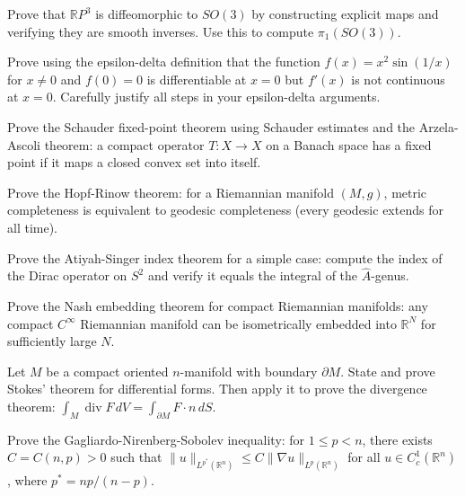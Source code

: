 \documentclass[12pt,a4paper]{exam}
\begin{document}
\begin{questions}
\vspace{0.3cm}

\question[3]
Prove that $\mathbb{R}P^3$ is diffeomorphic to $SO(3)$ by constructing explicit maps and verifying they are smooth inverses. Use this to compute $\pi_1(SO(3))$.

\vspace{0.3cm}

\question[3]
Prove using the epsilon-delta definition that the function $f(x) = x^2 \sin(1/x)$ for $x \neq 0$ and $f(0) = 0$ is differentiable at $x = 0$ but $f'(x)$ is not continuous at $x = 0$. Carefully justify all steps in your epsilon-delta arguments.

\vspace{0.3cm}

\question[2]
Prove the Schauder fixed-point theorem using Schauder estimates and the Arzela-Ascoli theorem: a compact operator $T: X \to X$ on a Banach space has a fixed point if it maps a closed convex set into itself.

\vspace{0.3cm}

\question[3]
Prove the Hopf-Rinow theorem: for a Riemannian manifold $(M,g)$, metric completeness is equivalent to geodesic completeness (every geodesic extends for all time).

\vspace{0.3cm}

\question[2]
Prove the Atiyah-Singer index theorem for a simple case: compute the index of the Dirac operator on $S^2$ and verify it equals the integral of the $\widehat{A}$-genus.

\vspace{0.3cm}

\question[5]
Prove the Nash embedding theorem for compact Riemannian manifolds: any compact $C^\infty$ Riemannian manifold can be isometrically embedded into $\mathbb{R}^N$ for sufficiently large $N$.

\vspace{0.3cm}

\question[4]
Let $M$ be a compact oriented $n$-manifold with boundary $\partial M$. State and prove Stokes' theorem for differential forms. Then apply it to prove the divergence theorem: $\int_M \operatorname{div} F \, dV = \int_{\partial M} F \cdot n \, dS$.

\vspace{0.3cm}

\question[6]
Prove the Gagliardo-Nirenberg-Sobolev inequality: for $1 \leq p < n$, there exists $C = C(n,p) > 0$ such that $\|u\|_{L^{p^*}(\mathbb{R}^n)} \leq C \|\nabla u\|_{L^p(\mathbb{R}^n)}$ for all $u \in C_c^1(\mathbb{R}^n)$, where $p^* = np/(n-p)$.


\end{questions}
\end{document}
